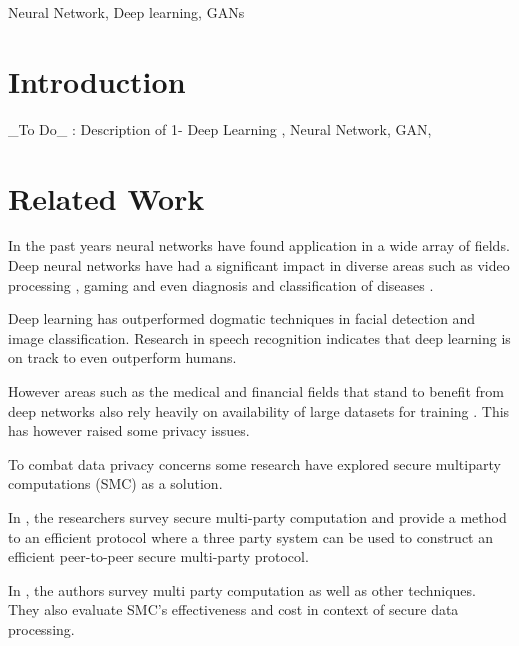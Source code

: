 \documentclass[conference]{IEEEtran}
\begin{document}
\begin{IEEEkeywords}
Neural Network, Deep learning, GANs
\end{IEEEkeywords}

\section{Introduction}
\_To Do\_ : Description of 1- Deep Learning , Neural Network, GAN,


\section{Related Work}

In the past years neural networks have found application in a wide array of fields.
Deep neural networks have had a significant impact in diverse areas such as video processing \cite{taigman2014deepface}, gaming \cite{chang2016google, lai2015giraffe} and even diagnosis and classification of diseases \cite{cruz2013deep,fakoor2013using}.

Deep learning has outperformed dogmatic techniques in facial detection and image classification\cite{krizhevsky2012imagenet,simard2003best}. Research in speech recognition \cite{hinton2012deep, graves2013speech } indicates that deep learning is on track to even outperform humans.

However areas such as the medical and financial fields that stand to benefit from deep networks also rely heavily on availability of large datasets for training \cite{chicurel2000databasing}. This has however raised some privacy issues.

To combat data privacy concerns some research have explored secure multiparty computations (SMC) as a solution.

In \cite{vaidya2003leveraging}, the researchers survey secure multi-party computation and provide a method to an efficient protocol where a three party system can be used to construct an efficient peer-to-peer secure multi-party protocol.

In \cite{7040943}, the authors survey multi party computation as well as other techniques. They also evaluate SMC's effectiveness and cost in context of secure data processing.
\end{document}
